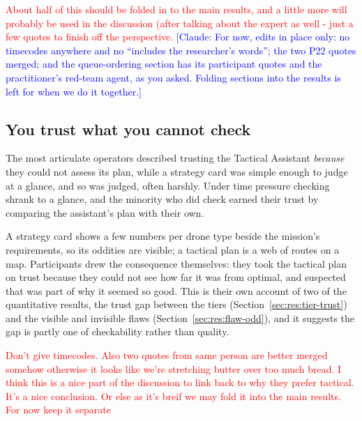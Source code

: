 
\textcolor{red}{About half of this should be folded in to the main results, and a little more will probably be used in the discussion (after talking about the expert as well - just a few quotes to finish off the perspective. }
\textcolor{blue}{[Claude: For now, edits in place only: no timecodes anywhere and no ``includes the researcher's words''; the two P22 quotes merged; and the queue-ordering section has its participant quotes and the practitioner's red-team agent, as you asked. Folding sections into the results is left for when we do it together.]}


\subsection{You trust what you cannot check}\label{sec:qual:trust-unchecked}

The most articulate operators described trusting the Tactical Assistant \emph{because} they could not assess its plan, while a strategy card was simple enough to judge at a glance, and so was judged, often harshly. Under time pressure checking shrank to a glance, and the minority who did check earned their trust by comparing the assistant's plan with their own.


\label{sec:qual:trust-unchecked:cant-check}
A strategy card shows a few numbers per drone type beside the mission's requirements, so its oddities are visible; a tactical plan is a web of routes on a map. Participants drew the consequence themselves: they took the tactical plan on trust because they could not see how far it was from optimal, and suspected that was part of why it seemed so good. This is their own account of two of the quantitative results, the trust gap between the tiers (Section~\ref{sec:res:tier-trust}) and the visible and invisible flaws (Section~\ref{sec:res:flaw-odd}), and it suggests the gap is partly one of checkability rather than quality.

\textcolor{red}{Don't give timecodes. Also two quotes from same person are better merged somehow otherwise it looks like we're stretching butter over too much bread.
I think this is a nice part of the discussion to link back to why they prefer tactical. It's a nice conclusion. Or else as it's breif we may fold it into the main results. For now keep it separate}

